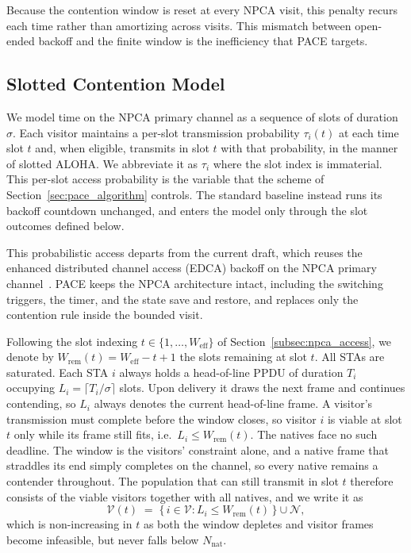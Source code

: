 \documentclass[journal,10pt]{IEEEtran}
\newcommand{\Nnat}{N_\mathrm{nat}}
\begin{document}
Because the contention window is reset at every NPCA visit, this penalty recurs each time rather than amortizing across visits. This mismatch between open-ended backoff and the finite window is the inefficiency that PACE targets.

\subsection{Slotted Contention Model}
\label{subsec:npca_window}

We model time on the NPCA primary channel as a sequence of slots of duration $\sigma$. Each visitor maintains a per-slot transmission probability $\tau_i(t)$ at each time slot $t$ and, when eligible, transmits in slot $t$ with that probability, in the manner of slotted ALOHA. We abbreviate it as $\tau_i$ where the slot index is immaterial. This per-slot access probability is the variable that the scheme of Section~\ref{sec:pace_algorithm} controls. The standard baseline instead runs its backoff countdown unchanged, and enters the model only through the slot outcomes defined below.

This probabilistic access departs from the current draft, which reuses the enhanced distributed channel access (EDCA) backoff on the NPCA primary channel~\cite{ieee80211bn}. PACE keeps the NPCA architecture intact, including the switching triggers, the timer, and the state save and restore, and replaces only the contention rule inside the bounded visit. 

Following the slot indexing $t\in\{1,\dots,W_\mathrm{eff}\}$ of Section~\ref{subsec:npca_access}, we denote by $W_\mathrm{rem}(t)=W_\mathrm{eff}-t+1$ the slots remaining at slot $t$. All STAs are saturated. Each STA $i$ always holds a head-of-line PPDU of duration $T_i$ occupying $L_i=\lceil T_i/\sigma\rceil$ slots. Upon delivery it draws the next frame and continues contending, so $L_i$ always denotes the current head-of-line frame. A visitor's transmission must complete before the window closes, so visitor $i$ is viable at slot $t$ only while its frame still fits, i.e.\ $L_i \le W_\mathrm{rem}(t)$. The natives face no such deadline. The window is the visitors' constraint alone, and a native frame that straddles its end simply completes on the channel, so every native remains a contender throughout. The population that can still transmit in slot $t$ therefore consists of the viable visitors together with all natives, and we write it as
\begin{equation}
    \mathcal{V}(t) \;=\; \bigl\{\, i\in\mathcal{V} :
    L_i \le W_\mathrm{rem}(t) \,\bigr\} \cup \mathcal{N},
    \label{eq:viable}
\end{equation}
which is non-increasing in $t$ as both the window depletes and visitor frames become infeasible, but never falls below $\Nnat$.
\end{document}
